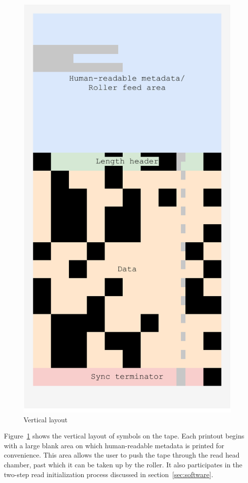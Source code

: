 \documentclass{article}
\begin{document}
\begin{landscape}
\begin{figure}[h]
				\includegraphics[width=\linewidth]{img/vertical}
				\caption{Vertical layout}
				\label{fig:vertical}
			\endminipage
		\end{figure}
	\end{landscape}
	
	Figure~\ref{fig:vertical} shows the vertical layout of symbols on the tape.
	Each printout begins with a large blank area on which human-readable
	metadata is printed for convenience. This area allows the user to push the
	tape through the read head chamber, past which it can be taken up by the
	roller. It also participates in the two-step read initialization process
	discussed in section~\ref{sec:software}.
	
\end{document}
